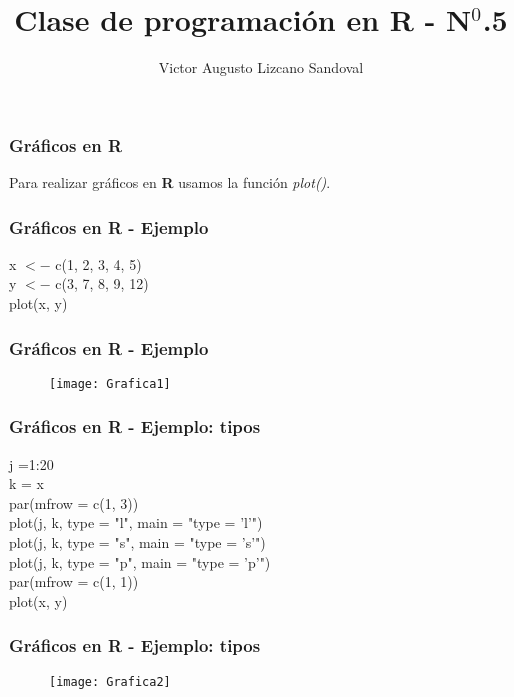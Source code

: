 \documentclass[12pt]{beamer}
\begin{document}
	\author{Victor Augusto Lizcano Sandoval}
	\title{Clase de programación en R - N$^{0}$.5}
	\begin{frame}[plain]
		\maketitle
	\end{frame}
	
	\begin{frame}
		\frametitle{Gráficos en R}
		Para realizar gráficos en \textbf{R} usamos la función \textit{plot()}.
	\end{frame}

\begin{frame}
	\frametitle{Gráficos en R - Ejemplo}
	x $<-$ c(1, 2, 3, 4, 5)\\
	y $<-$ c(3, 7, 8, 9, 12)\\
	
	plot(x, y)
\end{frame}

\begin{frame}
	\frametitle{Gráficos en R - Ejemplo}
	
	\begin{figure}
		\centering
		\texttt{[image: Grafica1]}
		
		\label{fig:grafica1}
	\end{figure}
\end{frame}

	\begin{frame}
		\frametitle{Gráficos en R - Ejemplo: tipos}
		j =1:20\\
		k = x\\
		
		par(mfrow = c(1, 3))\\
		
		plot(j, k, type = "l", main = "type = 'l'")\\
		plot(j, k, type = "s", main = "type = 's'")\\
		plot(j, k, type = "p", main = "type = 'p'")\\
		
		par(mfrow = c(1, 1))\\
		
		plot(x, y)
	\end{frame}

	\begin{frame}
		\frametitle{Gráficos en R - Ejemplo: tipos}
		\begin{figure}
			\centering
			\texttt{[image: Grafica2]}
			
			\label{fig:grafica2}
		\end{figure}
	\end{frame}
\end{document}
